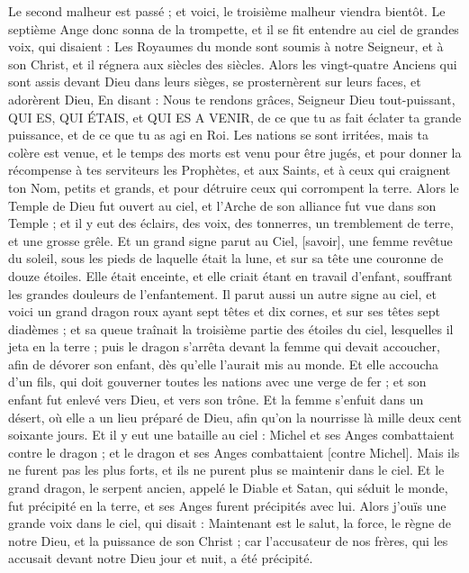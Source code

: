 \begin{multicols}{2}
Le second malheur est passé ; et voici, le troisième malheur viendra bientôt.
Le septième Ange donc sonna de la trompette, et il se fit entendre au ciel de grandes voix, qui disaient : Les Royaumes du monde sont soumis à notre Seigneur, et à son Christ, et il régnera aux siècles des siècles.
Alors les vingt-quatre Anciens qui sont assis devant Dieu dans leurs sièges, se prosternèrent sur leurs faces, et adorèrent Dieu,
En disant : Nous te rendons grâces, Seigneur Dieu tout-puissant, QUI ES, QUI ÉTAIS, et QUI ES A VENIR, de ce que tu as fait éclater ta grande puissance, et de ce que tu as agi en Roi.
Les nations se sont irritées, mais ta colère est venue, et le temps des morts est venu pour être jugés, et pour donner la récompense à tes serviteurs les Prophètes, et aux Saints, et à ceux qui craignent ton Nom, petits et grands, et pour détruire ceux qui corrompent la terre.
Alors le Temple de Dieu fut ouvert au ciel, et l'Arche de son alliance fut vue dans son Temple ; et il y eut des éclairs, des voix, des tonnerres, un tremblement de terre, et une grosse grêle.
\VerseOne{}Et un grand signe parut au Ciel, [savoir], une femme revêtue du soleil, sous les pieds de laquelle était la lune, et sur sa tête une couronne de douze étoiles.
Elle était enceinte, et elle criait étant en travail d'enfant, souffrant les grandes douleurs de l'enfantement.
Il parut aussi un autre signe au ciel, et voici un grand dragon roux ayant sept têtes et dix cornes, et sur ses têtes sept diadèmes ;
et sa queue traînait la troisième partie des étoiles du ciel, lesquelles il jeta en la terre ; puis le dragon s'arrêta devant la femme qui devait accoucher, afin de dévorer son enfant, dès qu'elle l'aurait mis au monde.
Et elle accoucha d'un fils, qui doit gouverner toutes les nations avec une verge de fer ; et son enfant fut enlevé vers Dieu, et vers son trône.
Et la femme s'enfuit dans un désert, où elle a un lieu préparé de Dieu, afin qu'on la nourrisse là mille deux cent soixante jours.
Et il y eut une bataille au ciel : Michel et ses Anges combattaient contre le dragon ; et le dragon et ses Anges combattaient [contre Michel].
Mais ils ne furent pas les plus forts, et ils ne purent plus se maintenir dans le ciel.
Et le grand dragon, le serpent ancien, appelé le Diable et Satan, qui séduit le monde, fut précipité en la terre, et ses Anges furent précipités avec lui.
Alors j'ouïs une grande voix dans le ciel, qui disait : Maintenant est le salut, la force, le règne de notre Dieu, et la puissance de son Christ ; car l'accusateur de nos frères, qui les accusait devant notre Dieu jour et nuit, a été précipité.

\end{multicols}
